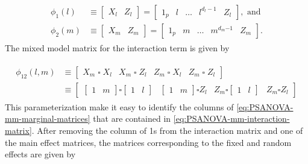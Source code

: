 \documentclass[12pt]{article}
\newcommand{\ms}{\scriptscriptstyle}
\theoremstyle{definition}
\begin{document}
\begin{align}
\begin{split} \label{eq:PSANOVA-mm-marginal-matrices}
\phi_1\left(l\right) &\equiv \left[ \begin{array}{c|c} X_l & Z_l \end{array} \right] 	= \left[ \begin{array}{c|c|c|c|c} 1_p & l   &\dots & l^{\ms d_{\ms l} -1}     & Z_l \end{array} \right], \mbox{ and} \\
\phi_2\left(m\right) &\equiv \left[ \begin{array}{c|c} X_m & Z_m \end{array} \right]  =\left[ \begin{array}{c|c|c|c|c} 1_p & m &\dots & m^{\ms d_{\ms m} \ms{- 1 }} & Z_m \end{array} \right].
\end{split}
\end{align}
\noindent
The mixed model matrix for the interaction term is given by 
 
\begin{align}
\begin{split}\label{eq:PSANOVA-mm-interaction-matrix}
\phi_{\ms 12}\left(l,m \right) &\equiv  \left[ \begin{array}{c|c|c|c} X_m\; \square \; X_l &  X_m\; \square \; Z_l  &  Z_m\; \square \; X_l  &  Z_m\; \square \; Z_l  \end{array} \right] \\
&\equiv 
\left[ 
\begin{array}{c|c|c|c}
 	\left[ \begin{array}{c|c} 1 & m \end{array} \right]  \square  \left[ \begin{array}{c|c} 1 & l \end{array} \right]& 
	\left[ \begin{array}{c|c} 1 & m \end{array} \right]  \square Z_l &
	 Z_m \square  \left[ \begin{array}{c|c} 1 & l \end{array} \right]  &
 	Z_m \square Z_l  
\end{array} 
\right]
\end{split}
\end{align}
This parameterization make it easy to identify the columns of \ref{eq:PSANOVA-mm-marginal-matrices} that are contained in \ref{eq:PSANOVA-mm-interaction-matrix}. After removing the column of 1s from the interaction matrix and one of the main effect matrices, the matrices corresponding to the fixed and random effects are given by 
\end{document}
